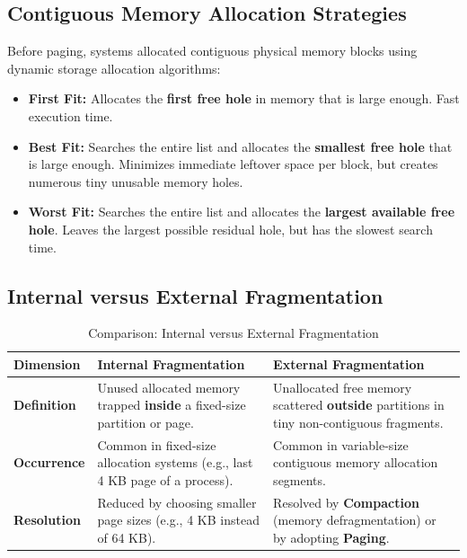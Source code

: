 \subsection{Contiguous Memory Allocation Strategies}
Before paging, systems allocated contiguous physical memory blocks using dynamic storage allocation algorithms:
\begin{itemize}
    \item \textbf{First Fit:} Allocates the \textbf{first free hole} in memory that is large enough. Fast execution time.
    \item \textbf{Best Fit:} Searches the entire list and allocates the \textbf{smallest free hole} that is large enough. Minimizes immediate leftover space per block, but creates numerous tiny unusable memory holes.
    \item \textbf{Worst Fit:} Searches the entire list and allocates the \textbf{largest available free hole}. Leaves the largest possible residual hole, but has the slowest search time.
\end{itemize}

\subsection{Internal versus External Fragmentation}
\begin{table}[htbp]
\centering
\small
\caption{Comparison: Internal versus External Fragmentation}
\label{tab:fragmentation_comparison}
\begin{tabularx}{\textwidth}{p{3.2cm} X X}
\toprule
\textbf{Dimension} & \textbf{Internal Fragmentation} & \textbf{External Fragmentation} \\
\midrule
\textbf{Definition} & Unused allocated memory trapped \textbf{inside} a fixed-size partition or page. & Unallocated free memory scattered \textbf{outside} partitions in tiny non-contiguous fragments. \\
\textbf{Occurrence} & Common in fixed-size allocation systems (e.g., last 4 KB page of a process). & Common in variable-size contiguous memory allocation segments. \\
\textbf{Resolution} & Reduced by choosing smaller page sizes (e.g., 4 KB instead of 64 KB). & Resolved by \textbf{Compaction} (memory defragmentation) or by adopting \textbf{Paging}. \\
\bottomrule
\end{tabularx}
\end{table}

